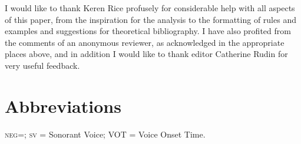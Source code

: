 \documentclass[output=paper]{LSP/langsci}
\begin{document}
I would like to thank Keren Rice profusely for considerable help with all aspects of this paper, from the inspiration for the analysis to the formatting of rules and examples and suggestions for theoretical bibliography. I have also profited from the comments of an anonymous reviewer, as acknowledged in the appropriate places above, and in addition I would like to thank editor Catherine Rudin for very useful feedback.

\section*{Abbreviations}
\textsc{neg}=; \textsc{sv} = Sonorant Voice; VOT = Voice Onset Time.

\printbibliography[heading=subbibliography,notkeyword=this]
 
\end{document}
